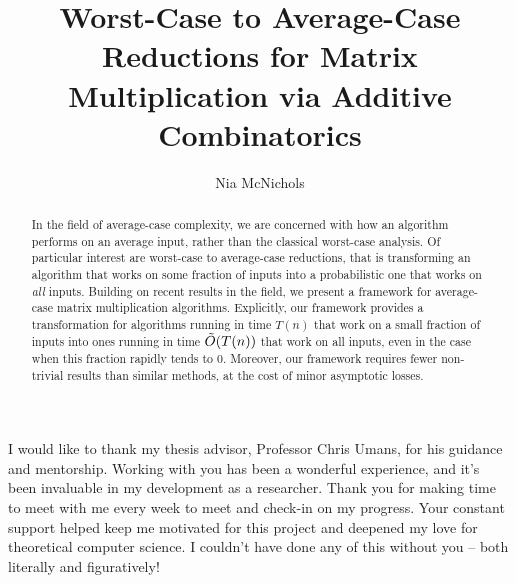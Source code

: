 \documentclass[12pt]{caltech_thesis}
\begin{document}
\title{Worst-Case to Average-Case Reductions for Matrix Multiplication via Additive Combinatorics}
\author{Nia McNichols}

\address{Pasadena, California}                     %



\maketitle[logo]

\begin{acknowledgements} 	 
   I would like to thank my thesis advisor, Professor Chris Umans, for his guidance and mentorship. Working with you has been a wonderful experience, and it's been invaluable in my development as a researcher. Thank you for making time to meet with me every week to meet and check-in on my progress. Your constant support helped keep me motivated for this project and deepened my love for theoretical computer science. I couldn't have done any of this without you -- both literally and figuratively!
\end{acknowledgements}

\begin{abstract}
   In the field of average-case complexity, we are concerned with how an algorithm performs on an average input, rather than the classical worst-case analysis. Of particular interest are worst-case to average-case reductions, that is transforming an algorithm that works on some fraction of inputs into a probabilistic one that works on \textit{all} inputs. Building on recent results in the field, we present a framework for average-case matrix multiplication algorithms. Explicitly, our framework provides a transformation for algorithms running in time $T(n)$ that work on a small fraction of inputs into ones running in time $\Tilde{O}(T(n))$ that work on all inputs, even in the case when this fraction rapidly tends to 0. Moreover, our framework requires fewer non-trivial results than similar methods, at the cost of minor asymptotic losses. 
\end{abstract}
\end{document}
